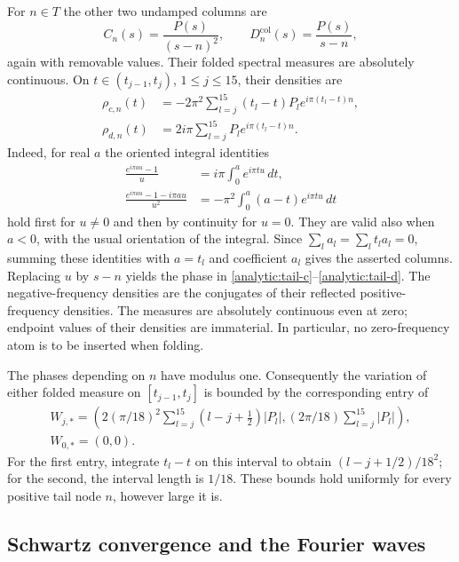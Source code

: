 \documentclass[11pt]{article}
\theoremstyle{remark}\newtheorem{remark}[theorem]{Remark}
\begin{document}
For $n\in T$ the other two undamped columns are
\[
 C_n(s)=\frac{P(s)}{(s-n)^2},\qquad
 D_n^{\mathrm{col}}(s)=\frac{P(s)}{s-n},
\]
again with removable values.  Their folded spectral measures are
absolutely continuous.  On
$t\in(t_{j-1},t_j)$, $1\le j\le15$, their densities are
\begin{align}
 \rho_{c,n}(t)
 &=-2\pi^2\sum_{l=j}^{15}(t_l-t)P_l
                     e^{i\pi(t_l-t)n},\label{analytic:tail-c}\\
 \rho_{d,n}(t)
 &=2i\pi\sum_{l=j}^{15}P_l
                     e^{i\pi(t_l-t)n}.\label{analytic:tail-d}
\end{align}
Indeed, for real $a$ the oriented integral identities
\begin{align*}
 \frac{e^{i\pi au}-1}{u}
 &=i\pi\int_0^a e^{i\pi tu}\,dt,\\
 \frac{e^{i\pi au}-1-i\pi au}{u^2}
 &=-\pi^2\int_0^a(a-t)e^{i\pi tu}\,dt
\end{align*}
hold first for $u\ne0$ and then by continuity for $u=0$.
They are valid also when $a<0$, with the usual orientation of the
integral.  Since $\sum_l a_l=\sum_l t_la_l=0$, summing these identities
with $a=t_l$ and coefficient $a_l$ gives the asserted columns.
Replacing $u$ by $s-n$ yields the phase in
\eqref{analytic:tail-c}--\eqref{analytic:tail-d}.  The negative-frequency
densities are the conjugates of their reflected positive-frequency
densities.  The measures are absolutely continuous even at zero;
endpoint values of their densities are immaterial.  In particular, no
zero-frequency atom is to be inserted when folding.

The phases depending on $n$ have modulus one.  Consequently the
variation of either folded measure on $[t_{j-1},t_j]$ is bounded by
the corresponding entry of
\begin{equation}\label{analytic:tail-variation}
 \begin{gathered}
 W_{j,*}=\left(
  2(\pi/18)^2\sum_{l=j}^{15}(l-j+\tfrac12)|P_l|,
  (2\pi/18)\sum_{l=j}^{15}|P_l|\right),
 \\ W_{0,*}=(0,0).
 \end{gathered}
\end{equation}
For the first entry, integrate $t_l-t$ on this interval to obtain
$(l-j+1/2)/18^2$; for the second, the interval length is $1/18$.
These bounds hold uniformly for every positive tail node $n$, however
large it is.

\subsection{Schwartz convergence and the Fourier waves}
\end{document}
